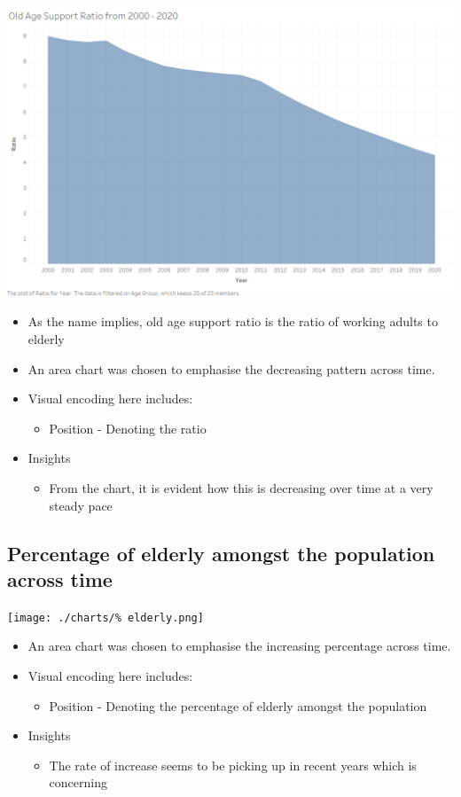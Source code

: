 \documentclass[a4paper, 11pt]{article}
\begin{document}
\begin{center}
\includegraphics[width=.9\linewidth]{./charts/old age support ratio.png}
\end{center}

\begin{itemize}
\item As the name implies, old age support ratio is the ratio of working adults to elderly
\item An area chart was chosen to emphasise the decreasing pattern across time.
\item Visual encoding here includes:
\begin{itemize}
\item Position - Denoting the ratio
\end{itemize}
\item Insights
\begin{itemize}
\item From the chart, it is evident how this is decreasing over time at a very steady pace
\end{itemize}
\end{itemize}
\subsection{Percentage of elderly amongst the population across time}
\label{sec:orgfe29d20}

\begin{center}
\texttt{[image: ./charts/\% elderly.png]}
\end{center}

\begin{itemize}
\item An area chart was chosen to emphasise the increasing percentage across time.
\item Visual encoding here includes:
\begin{itemize}
\item Position - Denoting the percentage of elderly amongst the population
\end{itemize}
\item Insights
\begin{itemize}
\item The rate of increase seems to be picking up in recent years which is concerning
\end{itemize}
\end{itemize}
\end{document}

